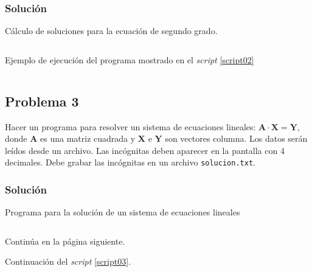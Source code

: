 \documentclass[a4paper,12pt,final]{article}
\begin{document}
    \subsubsection*{Solución}
      \begin{listing}[H]
        \caption{Cálculo de soluciones para la ecuación de segundo grado.}
        \label{script02}
        \inputminted[firstline=5]{matlab}{./laboratorio_1/problema02.m}
      \end{listing}

      \begin{listing}[H]
        \caption{Ejemplo de ejecución del programa mostrado en el
        \emph{script} \ref{script02}}
        \label{script02sample}
        \inputminted{text}{./laboratorio_1/problema02_sample.txt}
      \end{listing}
      \vspace{\fill}

  \newpage
  \subsection*{Problema 3}
    \noindent Hacer un programa para resolver un sistema de ecuaciones
    lineales: $\mathbf{A}\cdot\mathbf{X}=\mathbf{Y}$, donde $\mathbf{A}$ es
    una matriz cuadrada y $\mathbf{X}$ e $\mathbf{Y}$ son vectores columna.
    Los datos serán leídos desde un archivo. Las incógnitas deben aparecer
    en la pantalla con 4 decimales. Debe grabar las incógnitas en un
    archivo \texttt{solucion.txt}.

    \subsubsection*{Solución}
      \begin{listing}[H]
        \caption{Programa para la solución de un sistema de ecuaciones lineales}
        \label{script03}
        \inputminted[firstline=5,lastline=49]{matlab}{./laboratorio_1/problema03.m}
      \end{listing}
      \vspace{-1em}
      \noindent\small{Continúa en la página siguiente.}
      \vspace{\fill}

      \newpage
      \noindent\small{Continuación del \emph{script} \ref{script03}}.
      \vspace{-1em}
      \begin{listing}[H]
        \inputminted[firstline=51]{matlab}{./laboratorio_1/problema03.m}
      \end{listing}
      \vspace{\fill}
\end{document}
